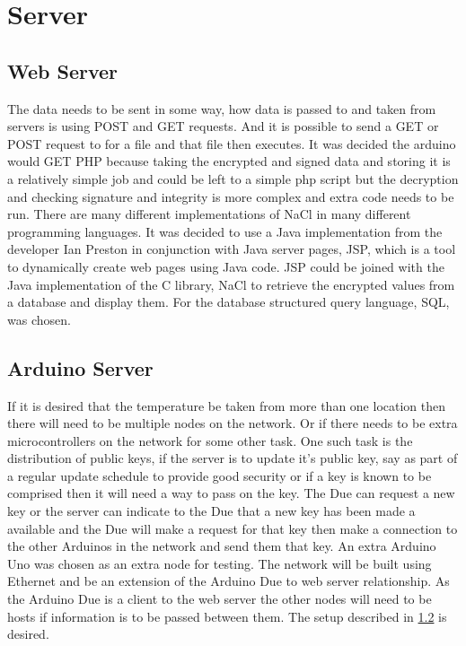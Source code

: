 \section{Server}

\subsection{Web Server}
The data needs to be sent in some way, how data is passed to and taken from servers is using POST and GET requests. And it is possible to send a GET or POST request to for a file and that file then executes. It was decided the arduino would GET PHP because taking the encrypted and signed data and storing it is a relatively simple job and could be left to a simple php script but the decryption and checking signature and integrity is more complex and extra code needs to be run. There are many different implementations of NaCl in many different programming languages. It was decided to use a Java implementation from the developer Ian Preston in conjunction with Java server pages, JSP, which is a tool to dynamically create web pages using Java code. JSP could be joined with the Java implementation of the C library, NaCl to retrieve the encrypted values from a database and display them. For the database structured query language, SQL, was chosen.

\subsection{Arduino Server}

If it is desired that the temperature be taken from more than one location then there will need to be multiple nodes on the network. Or if there needs to be extra microcontrollers on the network for some other task. One such task is the distribution of public keys, if the server is to update it's public key, say as part of a regular update schedule to provide good security or if a key is known to be comprised then it will need a way to pass on the key. The Due can request a new key or the server can indicate to the Due that a new key has been made a available and the Due will make a request for that key then make a connection to the other Arduinos in the network and send them that key. An extra Arduino Uno was chosen as an extra node for testing. The network will be built using Ethernet and be an extension of the Arduino Due to web server relationship. As the Arduino Due is a client to the web server the other nodes will need to be hosts if information is to be passed between them. The setup described in \ref{} is desired. 